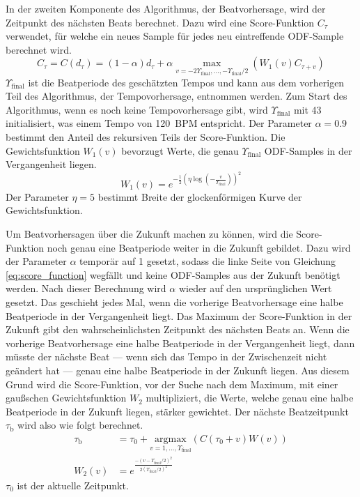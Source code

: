 {{{			%

			In der zweiten Komponente des Algorithmus,
				der Beatvorhersage,
				wird der Zeitpunkt des nächsten Beats berechnet.
			Dazu wird eine Score-Funktion $C_\tau$ verwendet,
				für welche ein neues Sample für jedes neu eintreffende ODF-Sample berechnet wird.
			\begin{equation}
				C_\tau = C(d_\tau) =
					(1 - \alpha)d_\tau +
					\alpha \max_{v = -2 \Upsilon_\text{final}, ..., -\Upsilon_\text{final} / 2}(W_1(v) C_{\tau + v})
				\label{eq:score_function}
			\end{equation}
			$\Upsilon_\text{final}$ ist die Beatperiode des geschätzten Tempos
				und kann aus dem vorherigen Teil des Algorithmus, der Tempovorhersage, entnommen werden.
			Zum Start des Algorithmus,
				wenn es noch keine Tempovorhersage gibt,
				wird $\Upsilon_\text{final}$ mit \num{43} initialisiert,
				was einem Tempo von \SI{120}{BPM} entspricht.
			Der Parameter $\alpha = 0.9$ bestimmt den Anteil des rekursiven Teils der Score-Funktion.
			Die Gewichtsfunktion $W_1(v)$ bevorzugt Werte, die genau $\Upsilon_\text{final}$ ODF-Samples in der Vergangenheit liegen.
			\begin{equation}
				W_1(v) = e^{-\frac{1}{2} \left( \eta \log \left( -\frac{v}{\Upsilon_\text{final}} \right) \right)^2}
			\end{equation}
			Der Parameter $\eta = 5$ bestimmt Breite der glockenförmigen Kurve der Gewichtsfunktion.

			Um Beatvorhersagen über die Zukunft machen zu können,
				wird die Score-Funktion noch genau eine Beatperiode weiter in die Zukunft gebildet.
			Dazu wird der Parameter $\alpha$ temporär auf \num{1} gesetzt,
				sodass die linke Seite von Gleichung \eqref{eq:score_function} wegfällt
				und keine ODF-Samples aus der Zukunft benötigt werden.
			Nach dieser Berechnung wird $\alpha$ wieder auf den ursprünglichen Wert gesetzt.
			Das geschieht jedes Mal,
				wenn die vorherige Beatvorhersage eine halbe Beatperiode in der Vergangenheit liegt.
			Das Maximum der Score-Funktion in der Zukunft gibt den wahrscheinlichsten Zeitpunkt des nächsten Beats an.
			Wenn die vorherige Beatvorhersage eine halbe Beatperiode in der Vergangenheit liegt,
				dann müsste der nächste Beat
				--- wenn sich das Tempo in der Zwischenzeit nicht geändert hat ---
				genau eine halbe Beatperiode in der Zukunft liegen.
			Aus diesem Grund wird die Score-Funktion,
				vor der Suche nach dem Maximum,
				mit einer gaußschen Gewichtsfunktion $W_2$ multipliziert,
				die Werte, welche genau eine halbe Beatperiode in der Zukunft liegen,
				stärker gewichtet.
			Der nächste Beatzeitpunkt $\tau_\text{b}$ wird also wie folgt berechnet.
			\begin{align}
				\tau_\text{b} &= \tau_0 + \underset{v = 1, ..., \Upsilon_\text{final}}{\text{argmax}}(C(\tau_0 + v)W(v)) \\
				W_2(v) &= e^{\frac{-(v - \Upsilon_\text{final} / 2)^2}{2(\Upsilon_\text{final} / 2)^2}}
			\end{align}
			$\tau_0$ ist der aktuelle Zeitpunkt.
		}
	}

}

